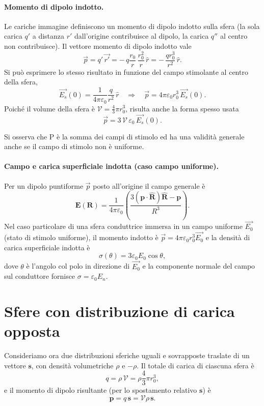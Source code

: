 \documentclass{book}
\begin{document}
\paragraph{Momento di dipolo indotto.}
Le cariche immagine definiscono un momento di dipolo indotto sulla sfera (la sola carica $q'$ a distanza $r'$ dall'origine contribuisce al dipolo, la carica $q''$ al centro non contribuisce). Il vettore momento di dipolo indotto vale
\[
\vec{p} = q'\, \vec{r'} = -\,q\frac{r_0}{r}\,\frac{r_0^2}{r}\,\hat{r}
= -\,\frac{q r_0^3}{r^2}\,\hat{r}.
\]
Si può esprimere lo stesso risultato in funzione del campo stimolante al centro della sfera, 
\[
\vec{ E_s}(0)=\frac{1}{4\pi\varepsilon_0}\frac{q}{r^2}\,\hat{ r}\quad\Rightarrow\quad
\vec{p} = 4\pi\varepsilon_0 r_0^3\,\vec{E_s}(0).
\]
Poiché il volume della sfera è $\mathcal{V}=\tfrac{4}{3}\pi r_0^3$, risulta anche la forma spesso usata
\[
\vec{ p} = 3\,\mathcal{V}\,\varepsilon_0\,\vec{ E_s}(0).
\]
 

Si osserva che P è la somma dei campi di stimolo ed ha una validità generale anche se il campo di stimolo non è uniforme.

\paragraph{Campo e carica superficiale indotta (caso campo uniforme).}
Per un dipolo puntiforme $\vec{ p}$ posto all'origine il campo generale è
\[
\mathbf E(\mathbf R) = \frac{1}{4\pi\varepsilon_0}\left(\frac{3(\mathbf p\cdot\hat{\mathbf R})\hat{\mathbf R}-\mathbf p}{R^3}\right).
\]
Nel caso particolare di una sfera conduttrice immersa in un campo uniforme $\vec{ E_0}$ (stato di stimolo uniforme), il momento indotto è $\vec{ p} = 4\pi\varepsilon_0 r_0^3\vec{ E_0}$ e la densità di carica superficiale indotta è
\[
\sigma(\theta)=3\varepsilon_0 E_0\cos\theta,
\]
dove $\theta$ è l'angolo col polo in direzione di $\vec{ E_0}$ e la componente normale del campo sul conduttore fornisce $\sigma=\varepsilon_0 E_n$.

\section{Sfere con distribuzione di carica opposta}

Consideriamo ora due distribuzioni sferiche uguali e sovrapposte traslate di un vettore $\mathbf s$, con densità volumetriche $\rho$ e $-\rho$. Il totale di carica di ciascuna sfera è
\[
q=\rho\,\mathcal{V}=\rho\frac{4}{3}\pi r_0^3,
\]
e il momento di dipolo risultante (per lo spostamento relativo $\mathbf s$) è
\[
\mathbf p = q\,\mathbf s = \mathcal{V}\rho\,\mathbf s.
\]
\end{document}
